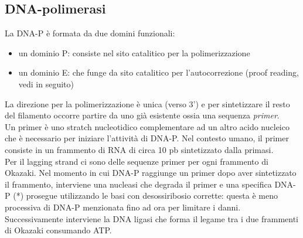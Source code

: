         \subsection{DNA-polimerasi}
            La DNA-P è formata da due domini funzionali:
            \begin{itemize}
                \item un dominio P: consiste nel sito catalitico per la polimerizzazione
                \item un dominio E: che funge da sito catalitico per l'autocorrezione (proof reading, vedi in seguito)
            \end{itemize}
            La direzione per la polimerizzazione è unica (verso 3') e per sintetizzare il resto del filamento occorre partire da uno già esistente ossia una sequenza \textit{primer}.  \\
            Un primer è uno stratch nucleotidico complementare ad un altro acido nucleico che è necessario per iniziare l'attività di DNA-P. Nel contesto umano, il primer consiste in un frammento di RNA di circa 10 pb sintetizzato dalla primasi.\\
            Per il lagging strand ci sono delle sequenze primer per ogni frammento di Okazaki. Nel momento in cui DNA-P raggiunge un primer dopo aver sintetizzato il frammento, interviene una nucleasi che degrada il primer e una specifica DNA-P (*) prosegue utilizzando le basi con desossiribosio corrette: questa è meno processiva di DNA-P menzionata fino ad ora per limitare i danni.
            Successivamente interviene la DNA ligasi che forma il legame tra i due frammenti di Okazaki consumando ATP.
                

